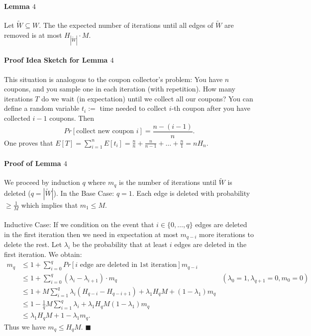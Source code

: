 \documentclass[letterpaper,12pt,oneside,onecolumn]{article}
\begin{document}
\paragraph{Lemma $4$}
Let $\tilde{W} \subseteq W$. The the expected number of iterations until all edges of $\tilde{W}$ are removed is at most $H_{|\tilde{W}|} \cdot M$.
\paragraph{Proof Idea Sketch for Lemma $4$}
This situation is analogous to the coupon collector's problem: You have $n$ coupons, and you sample one in each iteration (with repetition). How many iterations $T$ do we wait (in expectation) until we collect all our coupons? You can define a random variable $t_i := $ time needed to collect $i$-th coupon after you have collected $i-1$ coupons. Then
$$Pr[\text{collect new coupon } i] = \frac{n -(i-1)}{n}.$$
One proves that $E[T] = \sum_{i=1}^n E[t_i] = \frac{n}{n} + \frac{n}{n-1} + \dots + \frac{n}{1} = n H_n$.
\paragraph{Proof of Lemma $4$}
We proceed by induction $q$ where $m_q$ is the number of iterations until $\tilde{W}$ is deleted ($q = |\tilde{W}|$). In the Base Case: $q=1$. Each edge is deleted with probability $\geq \frac{1}{M}$ which implies that $m_1 \leq M$.
\paragraph{}
Inductive Case: If we condition on the event that $i \in \{0,\dots,q\}$ edges are deleted in the first iteration then we need in expectation at most $m_{q-i}$ more iterations to delete the rest. Let $\lambda_i$ be the probability that at least $i$ edges are deleted in the first iteration. We obtain:
\begin{align*}
m_q &\leq 1 + \sum_{i=0}^q Pr[i \text{ edge are deleted in 1st iteration}] m_{q-i} \\
&\leq 1 + \sum_{i=0}^q (\lambda_i - \lambda_{i+1}) \cdot m_q &(\lambda_0 = 1, \lambda_{q+1} = 0, m_0 = 0) \\
&\leq 1 + M \sum_{i=1}^q \lambda_i(H_{q-i} - H_{q-i + 1}) +\lambda_1H_qM +(1-\lambda_1)m_q \\
&\leq 1 - \frac{1}{q}M\sum_{i=1}^q\lambda_i + \lambda_1H_qM(1-\lambda_1)m_q \\
&\leq \lambda_1 H_q M + 1-\lambda_1 m_q.
\end{align*}
Thus we have $m_q \leq H_q M.$ $\blacksquare$
\end{document}
